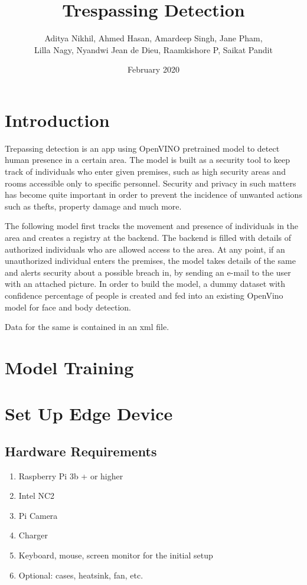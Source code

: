 \documentclass{article}
\title{Trespassing Detection}
\author{Aditya Nikhil, Ahmed Hasan, Amardeep Singh, Jane Pham, \\ Lilla Nagy, Nyandwi Jean de Dieu, Raamkishore P, Saikat Pandit}
\date{February 2020}
\begin{document}
\maketitle

\section{Introduction}
\quad Trepassing detection is an app using OpenVINO pretrained model to detect human presence in a certain area. The model is built as a security tool to keep track of individuals who enter given premises, such as high security areas and rooms accessible only to specific personnel. Security and privacy in such matters has become quite important in order to prevent the incidence of unwanted actions such as thefts, property damage and much more.

The following model first tracks the movement and presence of individuals in the area and creates a registry at the backend. The backend is filled with details of authorized individuals who are allowed access to the area. At any point, if an unauthorized individual enters the premises, the model takes details of the same and alerts security about a possible breach in, by sending an e-mail to the user with an attached picture. In order to build the model, a dummy dataset with confidence percentage of people is created and fed into an existing OpenVino model for face and body detection.

Data for the same is contained in an xml file.


\section{Model Training}

\section{Set Up Edge Device}

\subsection{Hardware Requirements}

\begin{enumerate}
    \item Raspberry Pi 3b + or higher 
    \item Intel NC2 
    \item Pi Camera 
    \item Charger
    \item Keyboard, mouse, screen monitor for the initial setup
    \item Optional: cases, heatsink, fan, etc.
\end{enumerate}
\end{document}
